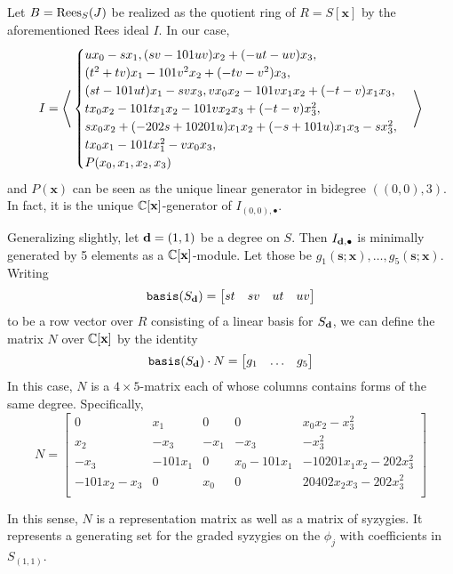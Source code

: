 \documentclass[fleqn,reqno]{amsart}
\begin{document}
\begin{example}[$\mt{ex201}$]
Let $B=\operatorname{Rees}_S(J)$ be realized as the quotient ring of $R=S[\mathbf x]$
by the aforementioned Rees ideal $I$.
In our case,
\[
	I=\Bigg\langle
	\begin{cases}
	u {x}_{0}-s {x}_{1},
	(s v-101 u v) {x}_{2}+(-u t-u v){x}_{3},\\
	(t^{2}+t v) {x}_{1}-101 v^{2} {x}_{2}+(-t v-v^{2}) {x}_{3},\\
	(s t-101 ut) {x}_{1}-s v {x}_{3},v {x}_{0} {x}_{2}-101 v {x}_{1} {x}_{2}+(-t-v) {x}_{1}{x}_{3},\\
  	t {x}_{0} {x}_{2}-101 t {x}_{1} {x}_{2}-101 v {x}_{2} {x}_{3}+(-t-v){x}_{3}^{2},\\
  	s {x}_{0} {x}_{2}+(-202 s+10201 u) {x}_{1} {x}_{2}+(-s+101 u){x}_{1} {x}_{3}-s {x}_{3}^{2},\\
	t {x}_{0} {x}_{1}-101 t {x}_{1}^{2}-v {x}_{0}{x}_{3},\\P(x_0,x_1,x_2,x_3)
	\end{cases}\Bigg\rangle
\]
and $P(\mathbf x)$ can be seen as the unique linear generator in bidegree $((0,0),3)$.
In fact, it is the unique $\mathbb{C}[\mathbf x]$-generator of $I_{(0,0),\bullet}$.

Generalizing slightly, let $\mathbf d=(1,1)$ be a degree on $S$.
Then $I_{\mathbf d,\bullet}$ is minimally generated by 5 elements as a $\mathbb{C}[\mathbf x]$-module.
Let those be $g_1(\mathbf s;\mathbf x),\ldots,g_5(\mathbf s;\mathbf x)$.
Writing
\[
	\mathop{\tt basis}(S_\mathbf d)=\begin{bmatrix}st& sv& ut& uv\end{bmatrix}
\]
to be a row vector over $R$ consisting of a linear basis for $S_\mathbf d$,
we can define the matrix $N$ over $\mathbb{C}[\mathbf x]$ by the identity
\[
	\mathop{\tt basis}(S_\mathbf d)\cdot N=\begin{bmatrix}g_1&\ldots&g_5\end{bmatrix}
\]
In this case, $N$ is a $4\times5$-matrix each of whose columns contains forms of the same degree.
Specifically,
\[
	N=\begin{bmatrix}0&
	       {x}_{1}&
	       0&
	       0&
	       {x}_{0} {x}_{2}-{x}_{3}^{2}\\
	       {x}_{2}&
	       {-{x}_{3}}&
	       {-{x}_{1}}&
	       {-{x}_{3}}&
	       {-{x}_{3}^{2}}\\
	       {-{x}_{3}}&
	       {-101 {x}_{1}}&
	       0&
	       {x}_{0}-101 {x}_{1}&
	       -10201 {x}_{1} {x}_{2}-202 {x}_{3}^{2}\\
	       -101 {x}_{2}-{x}_{3}&
	       0&
	       {x}_{0}&
	       0&
	       20402 {x}_{2} {x}_{3}-202 {x}_{3}^{2}\\
	       \end{bmatrix}
\]

In this sense, $N$ is a representation matrix as well as a matrix of syzygies.
It represents a generating set for the graded syzygies on the $\phi_j$ with coefficients
in $S_{(1,1)}$.
\end{example}
\end{document}
